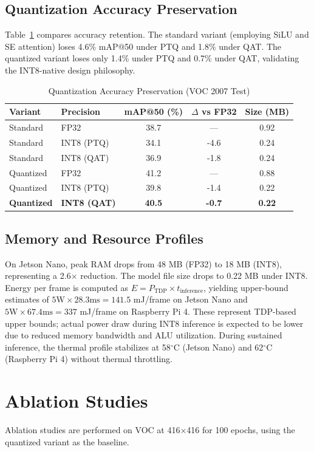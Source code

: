\documentclass[conference]{IEEEtran}
\begin{document}
\subsection{Quantization Accuracy Preservation}
Table~\ref{tab:quantization_preservation} compares accuracy retention. The standard variant (employing SiLU and SE attention) loses 4.6\% mAP@50 under PTQ and 1.8\% under QAT. The quantized variant loses only 1.4\% under PTQ and 0.7\% under QAT, validating the INT8-native design philosophy.

\begin{table}[h]
\centering
\caption{Quantization Accuracy Preservation (VOC 2007 Test)}
\label{tab:quantization_preservation}
\setlength{\tabcolsep}{4pt}
\begin{tabular}{llccc}
\toprule
Variant & Precision & mAP@50 (\%) & $\Delta$ vs FP32 & Size (MB) \\
\midrule
Standard & FP32 & 38.7 & --- & 0.92 \\
Standard & INT8 (PTQ) & 34.1 & -4.6 & 0.24 \\
Standard & INT8 (QAT) & 36.9 & -1.8 & 0.24 \\
Quantized & FP32 & 41.2 & --- & 0.88 \\
Quantized & INT8 (PTQ) & 39.8 & -1.4 & 0.22 \\
\textbf{Quantized} & \textbf{INT8 (QAT)} & \textbf{40.5} & \textbf{-0.7} & \textbf{0.22} \\
\bottomrule
\end{tabular}
\end{table}

\subsection{Memory and Resource Profiles}
On Jetson Nano, peak RAM drops from 48 MB (FP32) to 18 MB (INT8), representing a 2.6$\times$ reduction. The model file size drops to 0.22 MB under INT8. Energy per frame is computed as $E = P_{\text{TDP}} \times t_{\text{inference}}$, yielding upper-bound estimates of $5\text{W} \times 28.3\text{ms} = 141.5$ mJ/frame on Jetson Nano and $5\text{W} \times 67.4\text{ms} = 337$ mJ/frame on Raspberry Pi 4. These represent TDP-based upper bounds; actual power draw during INT8 inference is expected to be lower due to reduced memory bandwidth and ALU utilization. During sustained inference, the thermal profile stabilizes at 58$^\circ$C (Jetson Nano) and 62$^\circ$C (Raspberry Pi 4) without thermal throttling.

\section{Ablation Studies}
Ablation studies are performed on VOC at 416$\times$416 for 100 epochs, using the quantized variant as the baseline.
\end{document}
